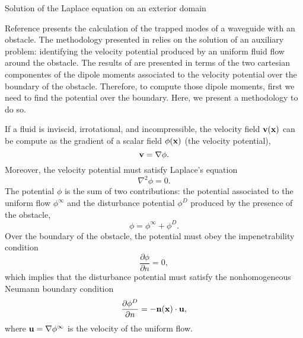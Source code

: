 \documentclass[11pt]{article}
\begin{document}
\begin{center}
{\Large Solution of the Laplace equation on an exterior domain}
\end{center}

Reference \cite{zhevandrov2025discrete} presents the calculation of the trapped modes of a waveguide with an obstacle. The methodology presented in \cite{zhevandrov2025discrete} relies on the solution of an auxiliary problem: identifying the velocity potential produced by an uniform fluid flow around the obstacle. The results of \cite{zhevandrov2025discrete} are presented in terms of the two cartesian componentes of the dipole moments associated to the velocity potential over the boundary of the obstacle. Therefore, to compute those dipole moments, first we need to find the potential over the boundary. Here, we present a methodology to do so.

If a fluid is inviscid, irrotational, and incompressible, the velocity field ${\bf v}({\bf x})$ can be compute as the gradient of a scalar field $\phi({\bf x})$ (the velocity potential),
\begin{equation}
  \label{eq:1}
  {\bf v} = \nabla\phi.
\end{equation}
Moreover, the velocity potential must satisfy Laplace's equation
\begin{equation}
  \label{eq:2}
  \nabla^2\phi = 0.
\end{equation}
The potential $\phi$ is the sum of two contributions: the potential associated to the uniform flow $\phi^\infty$ and the disturbance potential $\phi^D$ produced by the presence of the obstacle,
\begin{equation}
  \label{eq:3}
  \phi = \phi^\infty + \phi^D.
\end{equation}
Over the boundary of the obstacle, the potential must obey the impenetrability condition
\begin{equation}
  \label{eq:4}
  \frac{\partial\phi}{\partial n} = 0,
\end{equation}
which implies that the disturbance potential must satisfy the nonhomogeneous Neumann boundary condition
\begin{equation}
  \label{eq:5}
  \frac{\partial\phi^D}{\partial n} = -\mathbf{n}(\mathbf{x})\cdot{\bf u},
\end{equation}
where ${\bf u} = \nabla\phi^\infty$ is the velocity of the uniform flow.
\end{document}

